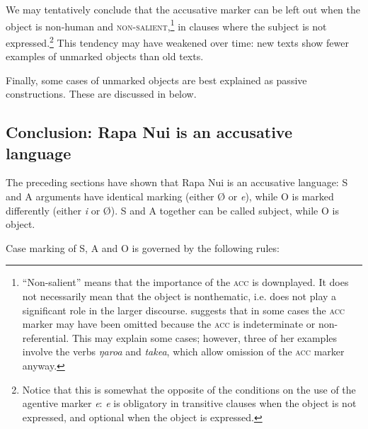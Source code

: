 We may tentatively conclude that the accusative marker can be left out when the object is non-human and \textsc{non-salient},\footnote{\label{fn:410}“Non-salient” means that the importance of the \textsc{acc} is downplayed. It does not necessarily mean that the object is nonthematic, i.e. does not play a significant role in the larger discourse. 
\citet[50]{WeberN2003} suggests that in some cases the \textsc{acc} marker may have been omitted because the \textsc{acc} is indeterminate or non-referential. This may explain some cases; however, three of her examples involve the verbs \textit{ŋaro{\ꞌ}a} and \textit{take{\ꞌ}a}, which allow omission of the \textsc{acc} marker anyway.}  in clauses where the subject is not expressed.\footnote{\label{fn:411}Notice that this is somewhat the opposite of the conditions on the use of the agentive marker \textit{e}: \textit{e} is obligatory in transitive clauses when the object is not expressed, and optional when the object is expressed.} This tendency may have weakened over time: new texts show fewer examples of unmarked objects than old texts.

Finally, some cases of unmarked objects are best explained as passive constructions. These are discussed in  below.

\subsection{Conclusion: Rapa Nui is an accusative language}\label{sec:8.4.2}

The preceding sections have shown that Rapa Nui is an accusative language: S and A arguments have identical marking (either Ø or \textit{e}), while O is marked differently (either \textit{i} or Ø). S and A together can be called subject, while O is object.

Case marking of S, A and O is governed by the following rules:

